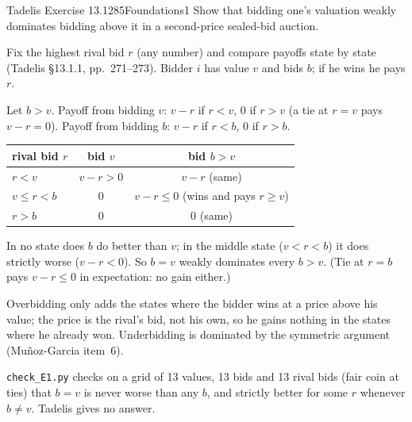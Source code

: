 \begin{exsol}{Tadelis Exercise 13.1}{285}{Foundations}{1}
\asked Show that bidding one's valuation weakly dominates bidding above it in a second-price
sealed-bid auction.

\method Fix the highest rival bid $r$ (any number) and compare payoffs state by state
(Tadelis \S13.1.1, pp.~271--273). Bidder $i$ has value $v$ and bids $b$; if he wins he pays $r$.

\solution
Let $b>v$. Payoff from bidding $v$: $v-r$ if $r<v$, $0$ if $r>v$ (a tie at $r=v$ pays $v-r=0$).
Payoff from bidding $b$: $v-r$ if $r<b$, $0$ if $r>b$.
\begin{center}
\begin{tabular}{lcc}
 rival bid $r$ & bid $v$ & bid $b>v$\\\hline
 $r<v$ & $v-r>0$ & $v-r$ (same)\\
 $v\le r<b$ & $0$ & $v-r\le 0$ (wins and pays $r\ge v$)\\
 $r>b$ & $0$ & $0$ (same)
\end{tabular}
\end{center}
In no state does $b$ do better than $v$; in the middle state ($v<r<b$) it does strictly worse
($v-r<0$). So $b=v$ weakly dominates every $b>v$. (Tie at $r=b$ pays $v-r\le 0$ in expectation:
no gain either.)

\interp Overbidding only adds the states where the bidder wins at a price above his value; the
price is the rival's bid, not his own, so he gains nothing in the states where he already won.
Underbidding is dominated by the symmetric argument (Muñoz-Garcia item~6).

\verify \texttt{check\_E1.py} checks on a grid of 13 values, 13 bids and 13 rival bids (fair
coin at ties) that $b=v$ is never worse than any $b$, and strictly better for some $r$ whenever
$b\ne v$. Tadelis gives no answer.

\end{exsol}
